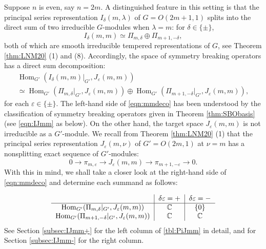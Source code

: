 Suppose $n$ is even, 
 say $n=2m$.  
A distinguished feature in this setting
 is that the principal series representation 
 $I_{\delta}(m,\lambda)$ of $G =O(2m+1,1)$
 splits into the direct sum
 of two irreducible $G$-modules
 when $\lambda=m$: for $\delta\in \{\pm\}$, 
\begin{equation}
\label{eqn:I+n2}
I_{\delta}(m,m) \simeq \Pi_{m,\delta} \oplus \Pi_{m+1,-\delta}, 
\end{equation}
both of which are smooth irreducible 
tempered representations of $G$,
 see Theorem \ref{thm:LNM20} (1) and (8).  
Accordingly, 
 the space of symmetry breaking operators has a direct sum decomposition:
\begin{multline}
\label{eqn:mmdeco}
{\operatorname{Hom}}_{G'}(I_{\delta}(m,m)|_{G'}, J_{\varepsilon}(m, m))
\\
\simeq 
{\operatorname{Hom}}_{G'}(\Pi_{m,\delta}|_{G'}, J_{\varepsilon}(m, m))
\oplus 
{\operatorname{Hom}}_{G'}(\Pi_{m+1,-\delta}|_{G'}, J_{\varepsilon}(m, m)), 
\end{multline}
for each $\varepsilon \in \{\pm\}$.  
The left-hand side of \eqref{eqn:mmdeco} 
 has been understood by the classification
 of symmetry breaking operators
 given in Theorem \ref{thm:SBObasis}
 (see \eqref{eqn:IJmm} as below). 
On the other hand,
 the target space $J_{\varepsilon}(m,m)$ is not irreducible
 as a $G'$-module.  
We recall from Theorem \ref{thm:LNM20} (1)
 that the principal series representation
 $J_\varepsilon(m,\nu)$
 of $G'=O(2m,1)$ at $\nu=m$ has a nonsplitting exact sequence
 of $G'$-modules:
\begin{equation}
\label{eqn:Jmm}
0 \to \pi_{m,\varepsilon} \to J_{\varepsilon}(m,m) \to \pi_{m+1,-\varepsilon} \to 0.  
\end{equation}
With this in mind,
 we shall take a closer look 
 at the right-hand side of \eqref{eqn:mmdeco}
 and determine each summand as follows: 


\begin{equation}
\label{tbl:PiJmm}
\begin{tabular}{c|c|c}
& {$\delta\varepsilon=+$}
&{$\delta\varepsilon=-$}
\\
\hline
  ${\operatorname{Hom}}_{G'}(\Pi_{m,\delta}|_{G'}, J_{\varepsilon}(m, m))$ 
& ${\mathbb{C}}$
& $\{0\}$
\\
${\operatorname{Hom}}_{G'}(\Pi_{m+1,-\delta}|_{G'}, J_{\varepsilon}(m, m))$ 
& ${\mathbb{C}}$
& ${\mathbb{C}}$ 
\end{tabular}
\end{equation}
See Section \ref{subsec:IJmm+}
 for the left column of \eqref{tbl:PiJmm} in detail,
 and for Section \ref{subsec:IJmm-} for the right column.




